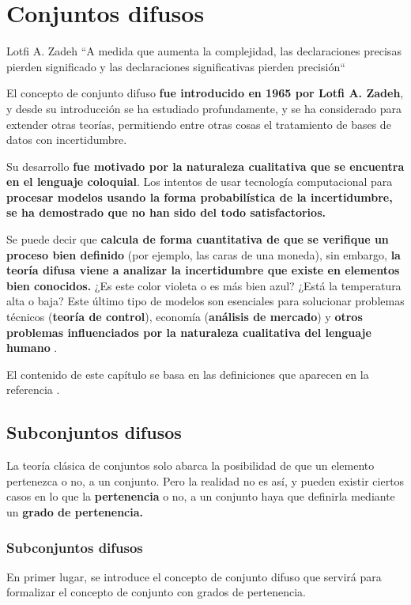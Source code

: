 
\chapter{Conjuntos difusos}
\begin{chapquote}{Lotfi A. Zadeh}
	``A medida que aumenta la complejidad, las declaraciones precisas pierden significado y las declaraciones significativas pierden precisión``
\end{chapquote}
El concepto de conjunto difuso \textbf{fue introducido en 1965 por Lotfi A. Zadeh}, y desde su introducción se ha estudiado profundamente, y se ha considerado para extender otras teorías, permitiendo entre otras cosas el tratamiento de bases de datos con incertidumbre.

Su desarrollo \textbf{fue motivado por la naturaleza cualitativa que se encuentra en el lenguaje coloquial}. Los intentos de usar tecnología computacional para \textbf{procesar modelos usando la forma probabilística de la incertidumbre, se ha demostrado que no han sido del todo satisfactorios.}

Se puede decir que \textbf{calcula de forma cuantitativa de que se verifique un proceso bien definido} (por ejemplo, las caras de una moneda), sin embargo, \textbf{la teoría difusa viene a analizar la incertidumbre que existe en elementos bien conocidos.} ¿Es este color violeta o es más bien azul? ¿Está la temperatura alta o baja? Este último tipo de modelos son esenciales para solucionar problemas técnicos (\textbf{teoría de control}), economía (\textbf{análisis de mercado}) y \textbf{otros problemas influenciados por la naturaleza cualitativa del lenguaje humano} \cite{historiafuzzy}.

El contenido de este capítulo se basa en las definiciones que aparecen en la referencia \cite{fuzzyintro}.

\section{Subconjuntos difusos}
La teoría clásica de conjuntos solo abarca la posibilidad de que un elemento pertenezca o no, a un conjunto. Pero la realidad no es así, y pueden existir ciertos casos en lo que la \textbf{pertenencia} o no, a un conjunto haya que definirla mediante un \textbf{grado de pertenencia.}

\subsection{Subconjuntos difusos}
En primer lugar, se introduce el concepto de conjunto difuso que servirá para formalizar el concepto de conjunto con grados de pertenencia.

